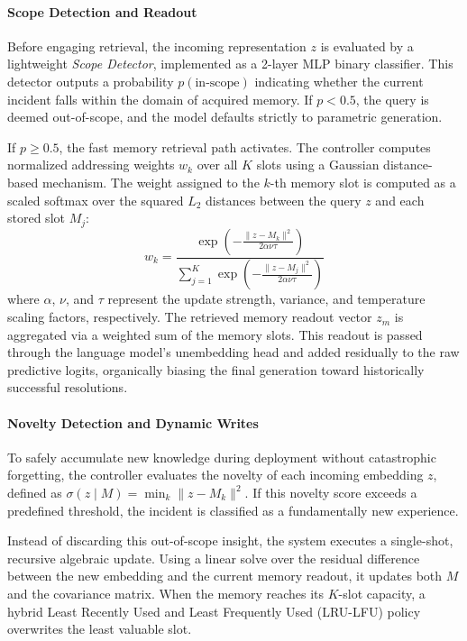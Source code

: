\documentclass[runningheads]{llncs}
\begin{document}
\paragraph{Scope Detection and Readout}
Before engaging retrieval, the incoming representation $z$ is evaluated by a lightweight \textit{Scope Detector}, implemented as a 2-layer MLP binary classifier. This detector outputs a probability $p(\text{in-scope})$ indicating whether the current incident falls within the domain of acquired memory. If $p < 0.5$, the query is deemed out-of-scope, and the model defaults strictly to parametric generation. 

If $p \geq 0.5$, the fast memory retrieval path activates. The controller computes normalized addressing weights $w_k$ over all $K$ slots using a Gaussian distance-based mechanism. The weight assigned to the $k$-th memory slot is computed as a scaled softmax over the squared $L_2$ distances between the query $z$ and each stored slot $M_j$:
\begin{equation}
    w_k = \frac{\exp\left(-\frac{\lVert z - M_k \rVert^2}{2\alpha \nu \tau}\right)}{\sum_{j=1}^K \exp\left(-\frac{\lVert z - M_j \rVert^2}{2\alpha \nu \tau}\right)}
\end{equation}
where $\alpha$, $\nu$, and $\tau$ represent the update strength, variance, and temperature scaling factors, respectively. The retrieved memory readout vector $z_m$ is aggregated via a weighted sum of the memory slots. This readout is passed through the language model's unembedding head and added residually to the raw predictive logits, organically biasing the final generation toward historically successful resolutions.

\paragraph{Novelty Detection and Dynamic Writes}
To safely accumulate new knowledge during deployment without catastrophic forgetting, the controller evaluates the novelty of each incoming embedding $z$, defined as $\sigma(z \mid M) = \min_k \lVert z - M_k \rVert^2$. If this novelty score exceeds a predefined threshold, the incident is classified as a fundamentally new experience. 

Instead of discarding this out-of-scope insight, the system executes a single-shot, recursive algebraic update. Using a linear solve over the residual difference between the new embedding and the current memory readout, it updates both $M$ and the covariance matrix. When the memory reaches its $K$-slot capacity, a hybrid Least Recently Used and Least Frequently Used (LRU-LFU) policy overwrites the least valuable slot.
\end{document}
